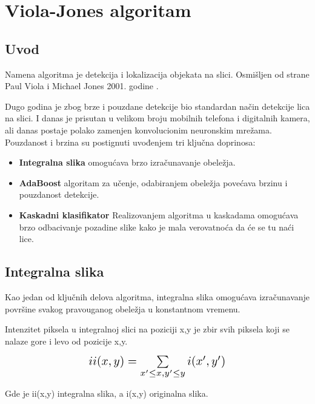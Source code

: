 \section{Viola-Jones algoritam}

\subsection{Uvod}

Namena algoritma je detekcija i lokalizacija objekata na slici. Osmišljen od
strane Paul Viola i Michael Jones 2001. godine \cite{Viola2001RapidOD}.

Dugo godina je zbog brze i pouzdane detekcije bio standardan način detekcije
lica na slici. I danas je prisutan u velikom broju mobilnih telefona i
digitalnih kamera, ali danas postaje polako zamenjen konvolucionim neuronskim
mrežama. \\

Pouzdanost i brzina su postignuti uvođenjem tri ključna doprinosa:
\begin{itemize}

\item \textbf{Integralna slika} omogućava brzo izračunavanje obeležja.
\item \textbf{AdaBoost} algoritam za učenje, odabiranjem obeležja povećava
  brzinu i pouzdanost detekcije.
\item \textbf{Kaskadni klasifikator} Realizovanjem algoritma u kaskadama
  omogućava brzo odbacivanje pozadine slike kako je mala verovatnoća da će se tu
  naći lice. \\
\end{itemize}


\subsection{Integralna slika}

Kao jedan od ključnih delova algoritma, integralna slika omogućava izračunavanje
površine svakog pravouganog obeležja u konstantnom vremenu.

Intenzitet piksela u integralnoj slici na poziciji x,y je zbir svih piksela koji
se nalaze gore i levo od pozicije x,y.

\begin{equation}
  \Scale[1.4]{ii(x,y)=\sum\limits_{x'\leq x, y'\leq y} i(x',y')}
  \label{IntegralImage_eq1}
\end{equation}

Gde je ii(x,y) integralna slika, a i(x,y) originalna slika. \\

